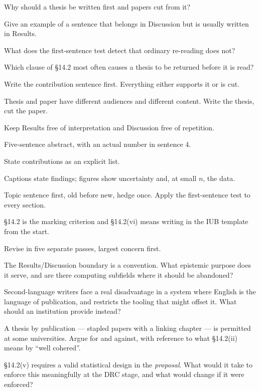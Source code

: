 \begin{checkpoint}
\begin{tightnum}
  \item Why should a thesis be written first and papers cut from it?
  \item Give an example of a sentence that belongs in Discussion but is usually
    written in Results.
  \item What does the first-sentence test detect that ordinary re-reading does
    not?
  \item Which clause of \S14.2 most often causes a thesis to be returned before
    it is read?
\end{tightnum}
\end{checkpoint}

\begin{chaptersummary}
\begin{tight}
  \item Write the contribution sentence first. Everything either supports it or
    is cut.
  \item Thesis and paper have different audiences and different content. Write
    the thesis, cut the paper.
  \item Keep Results free of interpretation and Discussion free of repetition.
  \item Five-sentence abstract, with an actual number in sentence 4.
  \item State contributions as an explicit list.
  \item Captions state findings; figures show uncertainty and, at small $n$,
    the data.
  \item Topic sentence first, old before new, hedge once. Apply the
    first-sentence test to every section.
  \item \S14.2 is the marking criterion and \S14.2(vi) means writing in the IUB
    template from the start.
  \item Revise in five separate passes, largest concern first.
\end{tight}
\end{chaptersummary}

\begin{reviewq}
  \item The Results/Discussion boundary is a convention. What epistemic purpose
    does it serve, and are there computing subfields where it should be
    abandoned?
  \item Second-language writers face a real disadvantage in a system where
    English is the language of publication, and  restricts the
    tooling that might offset it. What should an institution provide instead?
  \item A thesis by publication --- stapled papers with a linking chapter --- is
    permitted at some universities. Argue for and against, with reference to
    what \S14.2(ii) means by ``well cohered''.
  \item \S14.2(v) requires a valid statistical design in the \emph{proposal}.
    What would it take to enforce this meaningfully at the DRC stage, and what
    would change if it were enforced?
\end{reviewq}
